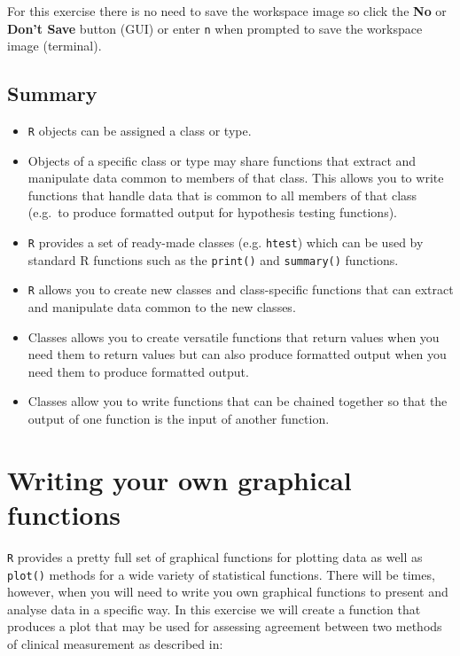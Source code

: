\documentclass[12pt,]{book}
\theoremstyle{definition}
\theoremstyle{definition}
\theoremstyle{definition}
\theoremstyle{remark}
\begin{document}
For this exercise there is no need to save the workspace image so click
the \textbf{No} or \textbf{Don't Save} button (GUI) or enter \texttt{n}
when prompted to save the workspace image (terminal).

\hypertarget{summary-5}{%
\section{Summary}\label{summary-5}}

\begin{itemize}
\item
  \texttt{R} objects can be assigned a class or type.
\item
  Objects of a specific class or type may share functions that extract
  and manipulate data common to members of that class. This allows you
  to write functions that handle data that is common to all members of
  that class (e.g.~to produce formatted output for hypothesis testing
  functions).
\item
  \texttt{R} provides a set of ready-made classes (e.g. \texttt{htest})
  which can be used by standard R functions such as the \texttt{print()}
  and \texttt{summary()} functions.
\item
  \texttt{R} allows you to create new classes and class-specific
  functions that can extract and manipulate data common to the new
  classes.
\item
  Classes allows you to create versatile functions that return values
  when you need them to return values but can also produce formatted
  output when you need them to produce formatted output.
\item
  Classes allow you to write functions that can be chained together so
  that the output of one function is the input of another function.
\end{itemize}

\hypertarget{exercise7}{%
\chapter{Writing your own graphical functions}\label{exercise7}}

\texttt{R} provides a pretty full set of graphical functions for
plotting data as well as \texttt{plot()} methods for a wide variety of
statistical functions. There will be times, however, when you will need
to write you own graphical functions to present and analyse data in a
specific way. In this exercise we will create a function that produces a
plot that may be used for assessing agreement between two methods of
clinical measurement as described in:
\end{document}
